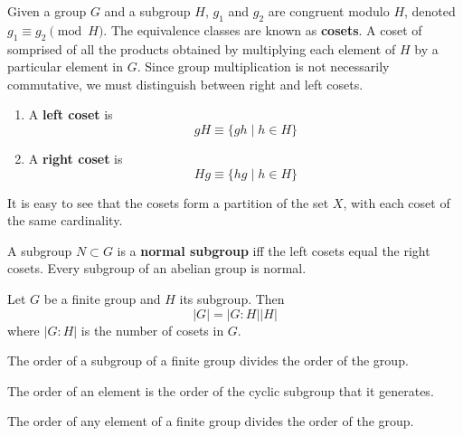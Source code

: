 \documentclass{article}
\begin{document}
    \begin{definition}
      Given a group $G$ and a subgroup $H$, $g_1$ and $g_2$ are congruent modulo $H$, denoted $g_1 \equiv g_2 \pmod{H}$. The equivalence classes are known as \textbf{cosets}. A coset of somprised of all the products obtained by multiplying each element of $H$ by a particular element in $G$. Since group multiplication is not necessarily commutative, we must distinguish between right and left cosets. 
      \begin{enumerate}
        \item A \textbf{left coset} is 
          \begin{equation}
            g H \equiv \{g h \;| \;h \in H \} 
          \end{equation}
        \item A \textbf{right coset} is 
          \begin{equation}
            H g \equiv \{h g \;|\; h \in H \}
          \end{equation}
      \end{enumerate}
      It is easy to see that the cosets form a partition of the set $X$, with each coset of the same cardinality. 
    \end{definition}

    \begin{definition}
      A subgroup $N \subset G$ is a \textbf{normal subgroup} iff the left cosets equal the right cosets. Every subgroup of an abelian group is normal. 
    \end{definition}

    \begin{theorem}
      Let $G$ be a finite group and $H$ its subgroup. Then 
      \begin{equation}
        |G| = |G:H| |H|
      \end{equation}
      where $|G:H|$ is the number of cosets in $G$. 
    \end{theorem}

    \begin{corollary}
      The order of a subgroup of a finite group divides the order of the group. 
    \end{corollary}

    \begin{definition}
      The order of an element is the order of the cyclic subgroup that it generates. 
    \end{definition}

    \begin{corollary}
      The order of any element of a finite group divides the order of the group. 
    \end{corollary}
\end{document}
